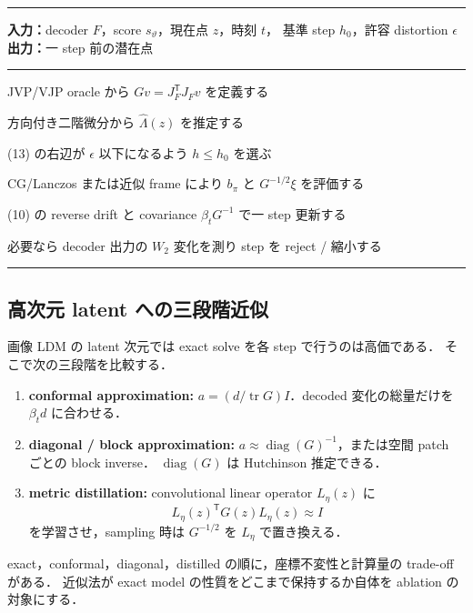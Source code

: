 \documentclass[uplatex,dvipdfmx,11pt,a4paper]{jsarticle}
\begin{document}
\begin{algorithm}[t]
\caption{曲率適応 Wasserstein latent reverse step（概念形）}
\label{alg:sampler}
\medskip\hrule\medskip
\noindent\textbf{入力：}decoder $F$，score $s_\vartheta$，現在点 $z$，時刻 $t$，
基準 step $h_0$，許容 distortion $\epsilon$\\
\noindent\textbf{出力：}一 step 前の潜在点
\medskip\hrule\medskip
\begin{algsteps}
  \item JVP/VJP oracle から $Gv=J_F^{\mathsf T}J_Fv$ を定義する
  \item 方向付き二階微分から $\widehat\Lambda(z)$ を推定する
  \item (13) の右辺が $\epsilon$ 以下になるよう $h\leq h_0$ を選ぶ
  \item CG/Lanczos または近似 frame により $b_\pi$ と $G^{-1/2}\xi$ を評価する
  \item (10) の reverse drift と covariance $\beta_tG^{-1}$ で一 step 更新する
  \item 必要なら decoder 出力の $W_2$ 変化を測り step を reject / 縮小する
\end{algsteps}
\medskip\hrule
\end{algorithm}

\subsection{高次元 latent への三段階近似}

画像 LDM の latent 次元では exact solve を各 step で行うのは高価である．
そこで次の三段階を比較する．

\begin{enumerate}
  \item \textbf{conformal approximation:}
    $a=(d/\operatorname{tr}G)I$．decoded 変化の総量だけを $\beta_td$ に合わせる．
  \item \textbf{diagonal / block approximation:}
    $a\approx\operatorname{diag}(G)^{-1}$，または空間 patch ごとの block inverse．
    $\operatorname{diag}(G)$ は Hutchinson 推定できる．
  \item \textbf{metric distillation:}
    convolutional linear operator $L_\eta(z)$ に
    \[
      L_\eta(z)^{\mathsf T}G(z)L_\eta(z)\approx I
    \]
    を学習させ，sampling 時は $G^{-1/2}$ を $L_\eta$ で置き換える．
\end{enumerate}

exact，conformal，diagonal，distilled の順に，座標不変性と計算量の trade-off がある．
近似法が exact model の性質をどこまで保持するか自体を ablation の対象にする．
\end{document}
